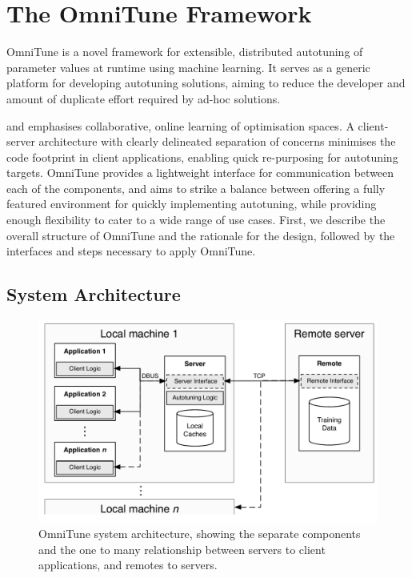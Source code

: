 \documentclass[nonatbib,preprint,9pt]{sigplanconf}
\begin{document}
\section{The OmniTune Framework}\label{sec:autotune}

OmniTune is a novel framework for extensible, distributed autotuning
of parameter values at runtime using machine learning. It serves as a
generic platform for developing autotuning solutions, aiming to reduce
the developer and amount of duplicate effort required by ad-hoc
solutions.

and emphasises collaborative, online learning of optimisation
spaces. A client-server architecture with clearly delineated
separation of concerns minimises the code footprint in client
applications, enabling quick re-purposing for autotuning
targets. OmniTune provides a lightweight interface for communication
between each of the components, and aims to strike a balance between
offering a fully featured environment for quickly implementing
autotuning, while providing enough flexibility to cater to a wide
range of use cases. First, we describe the overall structure of
OmniTune and the rationale for the design, followed by the interfaces
and steps necessary to apply OmniTune.


\subsection{System Architecture}

\begin{figure}
\centering
\includegraphics[width=.98\columnwidth]{img/omnitune-system-overview.pdf}
\caption[OmniTune system diagram]{%
  OmniTune system architecture, showing the separate components and
  the one to many relationship between servers to client applications,
  and remotes to servers.%
}
\label{fig:omnitune-system-overview}
\end{figure}
\end{document}
